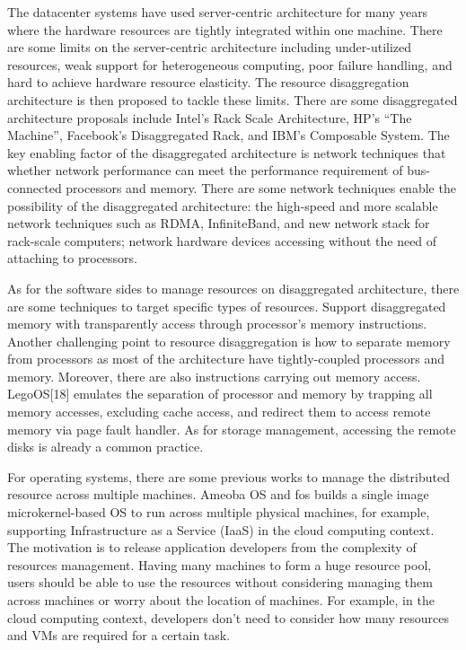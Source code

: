 \documentclass[twocolumn]{article}
\begin{document}
The datacenter systems have used server-centric architecture for many years where the hardware resources are tightly integrated within one machine. There are some limits on the server-centric architecture including under-utilized resources, weak support for heterogeneous computing, poor failure handling, and hard to achieve hardware resource elasticity. The resource disaggregation architecture is then proposed to tackle these limits. There are some disaggregated architecture proposals include Intel’s Rack Scale Architecture\cite{Intel_RSA}, HP’s “The Machine”\cite{HP_The_Machine}, Facebook’s Disaggregated Rack\cite{FB_disaggregated_rack}, and IBM’s Composable System\cite{IBM_composable_system}. The key enabling factor of the disaggregated architecture is network techniques that whether network performance can meet the performance requirement of bus-connected processors and memory\cite{Network_requirement}. There are some network techniques enable the possibility of the disaggregated architecture: the high-speed and more scalable network techniques such as RDMA\cite{RDMA}, InfiniteBand\cite{InfiniteBand}, and new network stack for rack-scale computers\cite{Network_stack_for_rack}; network hardware devices accessing without the need of attaching to processors\cite{NVM_performance, NVM_performance2}. \par
    As for the software sides to manage resources on disaggregated architecture, there are some techniques to target specific types of resources. Support disaggregated memory with transparently access through processor’s memory instructions\cite{Disaggregated_memory, Disaggregated_memory2}. Another challenging point to resource disaggregation is how to separate memory from processors as most of the architecture have tightly-coupled processors and memory. Moreover, there are also instructions carrying out memory access. LegoOS[18] emulates the separation of processor and memory by trapping all memory accesses, excluding cache access, and redirect them to access remote memory via page fault handler. As for storage management, accessing the remote disks is already a common practice\cite{VMware_virtual_SAN, Amazon_EC2_root_volume}. \par
    For operating systems, there are some previous works to manage the distributed resource across multiple machines. Ameoba OS\cite{Amoeba_OS} and fos\cite{fos} builds a single image microkernel-based OS to run across multiple physical machines, for example, supporting Infrastructure as a Service (IaaS) in the cloud computing context. The motivation is to release application developers from the complexity of resources management. Having many machines to form a huge resource pool, users should be able to use the resources without considering managing them across machines or worry about the location of machines. For example, in the cloud computing context, developers don’t need to consider how many resources and VMs are required for a certain task. \par
\end{document}
